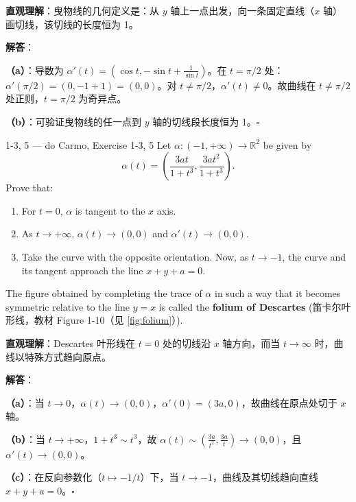 \begin{solution}
\textbf{直观理解}：曳物线的几何定义是：从 $y$ 轴上一点出发，向一条固定直线（$x$ 轴）画切线，该切线的长度恒为 1。

\textbf{解答}：

\textbf{（a）}：导数为 $\alpha'(t) = (\cos t, -\sin t + \frac{1}{\sin t})$。在 $t = \pi/2$ 处：$\alpha'(\pi/2) = (0, -1 + 1) = (0, 0)$。对 $t \neq \pi/2$，$\alpha'(t) \neq 0$。故曲线在 $t \neq \pi/2$ 处正则，$t = \pi/2$ 为奇异点。

\textbf{（b）}：可验证曳物线的任一点到 $y$ 轴的切线段长度恒为 1。$\square$
\end{solution}

\begin{exercise}{1-3, 5 — do Carmo, Exercise 1-3, 5}
Let $\alpha: (-1, +\infty) \to \mathbb{R}^2$ be given by
\[
\alpha(t) = \left(\frac{3at}{1+t^3}, \frac{3at^2}{1+t^3}\right).
\]
Prove that:
\begin{enumerate}
\item[a.] For $t = 0$, $\alpha$ is tangent to the $x$ axis.
\item[b.] As $t \to +\infty$, $\alpha(t) \to (0,0)$ and $\alpha'(t) \to (0,0)$.
\item[c.] Take the curve with the opposite orientation. Now, as $t \to -1$, the curve and its tangent approach the line $x + y + a = 0$.
\end{enumerate}
The figure obtained by completing the trace of $\alpha$ in such a way that it becomes symmetric relative to the line $y = x$ is called the \textbf{folium of Descartes} (笛卡尔叶形线，教材 Figure 1-10（见 \cref{fig:folium}）).
\end{exercise}

\begin{solution}
\textbf{直观理解}：Descartes 叶形线在 $t=0$ 处的切线沿 $x$ 轴方向，而当 $t \to \infty$ 时，曲线以特殊方式趋向原点。

\textbf{解答}：

\textbf{（a）}：当 $t \to 0$，$\alpha(t) \to (0, 0)$，$\alpha'(0) = (3a, 0)$，故曲线在原点处切于 $x$ 轴。

\textbf{（b）}：当 $t \to +\infty$，$1+t^3 \sim t^3$，故 $\alpha(t) \sim (\frac{3a}{t^2}, \frac{3a}{t}) \to (0, 0)$，且 $\alpha'(t) \to (0, 0)$。

\textbf{（c）}：在反向参数化（$t \mapsto -1/t$）下，当 $t \to -1$，曲线及其切线趋向直线 $x + y + a = 0$。$\square$
\end{solution}

